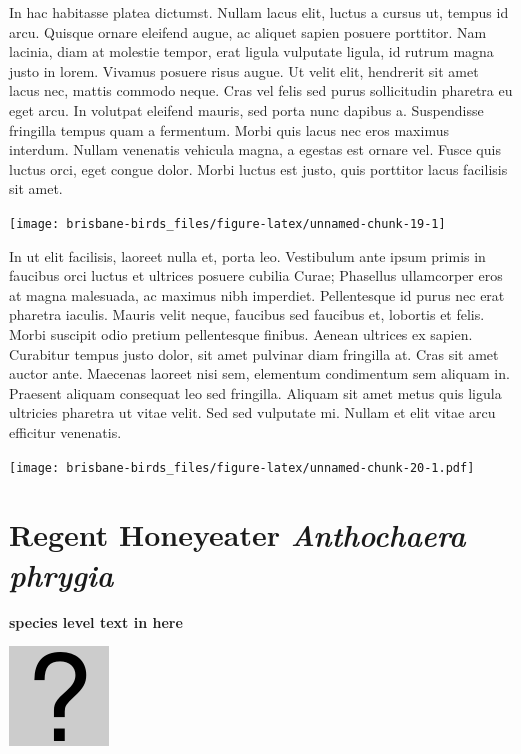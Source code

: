 \documentclass[]{book}
\let\origfigure\figure
\let\endorigfigure\endfigure
\renewenvironment{figure}[1][2] {
  \expandafter\origfigure\expandafter[H]
} {
  \endorigfigure
}
\begin{document}
In hac habitasse platea dictumst. Nullam lacus elit, luctus a cursus ut,
tempus id arcu. Quisque ornare eleifend augue, ac aliquet sapien posuere
porttitor. Nam lacinia, diam at molestie tempor, erat ligula vulputate
ligula, id rutrum magna justo in lorem. Vivamus posuere risus augue. Ut
velit elit, hendrerit sit amet lacus nec, mattis commodo neque. Cras vel
felis sed purus sollicitudin pharetra eu eget arcu. In volutpat eleifend
mauris, sed porta nunc dapibus a. Suspendisse fringilla tempus quam a
fermentum. Morbi quis lacus nec eros maximus interdum. Nullam venenatis
vehicula magna, a egestas est ornare vel. Fusce quis luctus orci, eget
congue dolor. Morbi luctus est justo, quis porttitor lacus facilisis sit
amet.

\begin{figure}
\texttt{[image: brisbane-birds\_files/figure-latex/unnamed-chunk-19-1]} \caption{insert figure caption}\label{fig:unnamed-chunk-19}
\end{figure}

In ut elit facilisis, laoreet nulla et, porta leo. Vestibulum ante ipsum
primis in faucibus orci luctus et ultrices posuere cubilia Curae;
Phasellus ullamcorper eros at magna malesuada, ac maximus nibh
imperdiet. Pellentesque id purus nec erat pharetra iaculis. Mauris velit
neque, faucibus sed faucibus et, lobortis et felis. Morbi suscipit odio
pretium pellentesque finibus. Aenean ultrices ex sapien. Curabitur
tempus justo dolor, sit amet pulvinar diam fringilla at. Cras sit amet
auctor ante. Maecenas laoreet nisi sem, elementum condimentum sem
aliquam in. Praesent aliquam consequat leo sed fringilla. Aliquam sit
amet metus quis ligula ultricies pharetra ut vitae velit. Sed sed
vulputate mi. Nullam et elit vitae arcu efficitur venenatis.

\begin{figure}
\centering
\texttt{[image: brisbane-birds\_files/figure-latex/unnamed-chunk-20-1.pdf]}
\caption{\label{fig:unnamed-chunk-20}insert figure caption}
\end{figure}

\section{\texorpdfstring{Regent Honeyeater \emph{Anthochaera
phrygia}}{Regent Honeyeater Anthochaera phrygia}}\label{regent-honeyeater-anthochaera-phrygia}

\textbf{species level text in here}

\begin{figure}
\centering
\includegraphics{assets/missing.png}
\caption{No image for species}
\end{figure}
\end{document}
